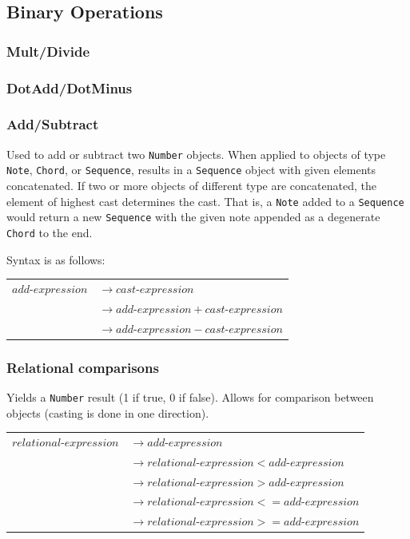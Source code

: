 \documentclass[12pt,A4]{book}
\begin{document}
\subsection{Binary Operations}


\subsubsection{Mult/Divide}

\subsubsection{DotAdd/DotMinus}

\subsubsection{Add/Subtract}
Used to add or subtract two \verb|Number| objects. When applied to objects of type \verb|Note|, \verb|Chord|, or \verb|Sequence|, results in a \verb|Sequence| object with given elements concatenated. If two or more objects of different type are concatenated, the element of highest cast determines the cast. That is, a \verb|Note| added to a \verb|Sequence| would return a new \verb|Sequence| with the given note appended as a degenerate \verb|Chord| to the end.

Syntax is as follows:\\

\begin{tabular}{l l}
$add\mbox{-}expression$ & $\rightarrow cast\mbox{-}expression$ \\
& $\rightarrow add\mbox{-}expression + cast\mbox{-}expression$\\
& $\rightarrow add\mbox{-}expression - cast\mbox{-}expression$
\end{tabular}

\subsubsection{Relational comparisons}
Yields a \verb|Number| result (1 if true, 0 if false). Allows for comparison between objects (casting is done in one direction).

\begin{tabular}{l l}
$relational\mbox{-}expression$  & $\rightarrow add\mbox{-}expression$\\
& $\rightarrow relational\mbox{-}expression < add\mbox{-}expression$ \\
& $\rightarrow relational\mbox{-}expression > add\mbox{-}expression$ \\
& $\rightarrow relational\mbox{-}expression <= add\mbox{-}expression$ \\
& $\rightarrow relational\mbox{-}expression >= add\mbox{-}expression$ \\
\end{tabular}
\end{document}
